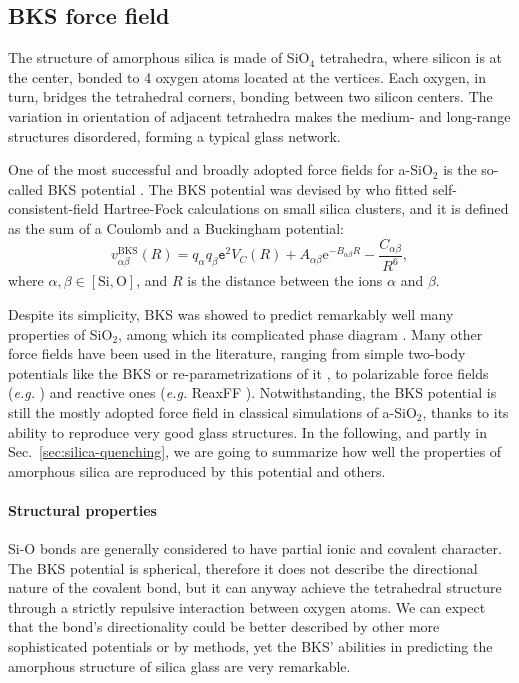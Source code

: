 \subsection{BKS force field}  \label{sec:silica-force-field}


The structure of amorphous silica is made of SiO$_4$ tetrahedra, where silicon is at the center, bonded to 4 oxygen atoms located at the vertices. Each oxygen, in turn, bridges the tetrahedral corners, bonding between two silicon centers. The variation in orientation of adjacent tetrahedra makes the medium- and long-range structures disordered, forming a typical glass network.

One of the most successful and broadly adopted force fields for a-SiO$_2$ is the so-called BKS potential \cite{Silica-BKS-1990}. 
The BKS potential was devised by \citeauthor*{Silica-BKS-1990} who fitted self-consistent-field Hartree-Fock calculations on small silica clusters, and it is defined as the sum of a Coulomb and a Buckingham potential:
\begin{equation}
    v_{\alpha\beta}^{\mathrm{BKS}}(R) = q_\alpha q_\beta \mathtt{e}^2 V_C(R) + A_{\alpha\beta}\mathrm{e}^{-B_{\alpha\beta}R} - \frac{C_{\alpha\beta}}{R^6}, \label{eq:BKS}
\end{equation}
where $\alpha,\beta \in [\text{Si},\text{O}]$, and $R$ is the distance between the ions $\alpha$ and $\beta$. 

Despite its simplicity, BKS was showed to predict remarkably well many properties of SiO$_2$, among which its complicated phase diagram \cite{Saika2004}. 
Many other force fields have been used in the literature, ranging from simple two-body potentials like the BKS or re-parametrizations of it \cite{Carre2008}, to polarizable force fields (\emph{e.g.} \citet{Tangney2002}) and reactive ones (\emph{e.g.} ReaxFF \cite{Yuan2001}). 
Notwithstanding, the BKS potential is still the mostly adopted force field in classical simulations of a-SiO$_2$, thanks to its ability to reproduce very good glass structures. 
In the following, and partly in Sec.~\ref{sec:silica-quenching}, we are going to summarize how well the properties of amorphous silica are reproduced by this potential and others.


\paragraph{Structural properties}

Si-O bonds are generally considered to have partial ionic and covalent character. The BKS potential is spherical, therefore it does not describe the directional nature of the covalent bond, but it can anyway achieve the tetrahedral structure through a strictly repulsive interaction between oxygen atoms. We can expect that the bond's directionality could be better described by other more sophisticated potentials or by \abinitio methods, yet the BKS' abilities in predicting the amorphous structure of silica glass are very remarkable. 

